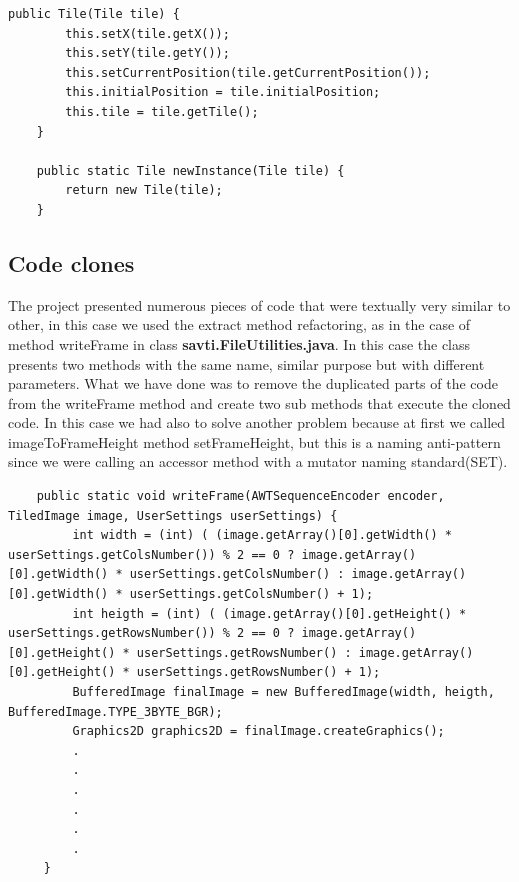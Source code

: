 \documentclass{article}
\begin{document}
    \begin{lstlisting}[caption={Clone Factory Method},captionpos =b]
     public Tile(Tile tile) {
        this.setX(tile.getX());
        this.setY(tile.getY());
        this.setCurrentPosition(tile.getCurrentPosition());
        this.initialPosition = tile.initialPosition;
        this.tile = tile.getTile();
    }

    public static Tile newInstance(Tile tile) {
        return new Tile(tile);
    }
\end{lstlisting}
\newpage
\subsection{Code clones}
The project presented numerous pieces of code that were textually very similar to other, in this case we used the extract method refactoring, as in the case of method writeFrame in class \textbf{savti.FileUtilities.java}.
In this case the class presents two methods with the same name, similar purpose but with different parameters. What we have done was to remove the duplicated parts of the code from the writeFrame method and create two sub methods that execute the cloned code.
In this case we had also to solve another problem because at first we called imageToFrameHeight method setFrameHeight, but this is a naming anti-pattern since we were calling an accessor method with a mutator naming standard(SET).\\
\begin{minipage}{0.5 \textwidth}
\begin{lstlisting}
    public static void writeFrame(AWTSequenceEncoder encoder, TiledImage image, UserSettings userSettings) {
         int width = (int) ( (image.getArray()[0].getWidth() * userSettings.getColsNumber()) % 2 == 0 ? image.getArray()[0].getWidth() * userSettings.getColsNumber() : image.getArray()[0].getWidth() * userSettings.getColsNumber() + 1);
         int heigth = (int) ( (image.getArray()[0].getHeight() * userSettings.getRowsNumber()) % 2 == 0 ? image.getArray()[0].getHeight() * userSettings.getRowsNumber() : image.getArray()[0].getHeight() * userSettings.getRowsNumber() + 1);
         BufferedImage finalImage = new BufferedImage(width, heigth, BufferedImage.TYPE_3BYTE_BGR);
         Graphics2D graphics2D = finalImage.createGraphics();
         .
         .
         .
         .
         .
         .
     }
\end{lstlisting}
\end{minipage}
\end{document}
